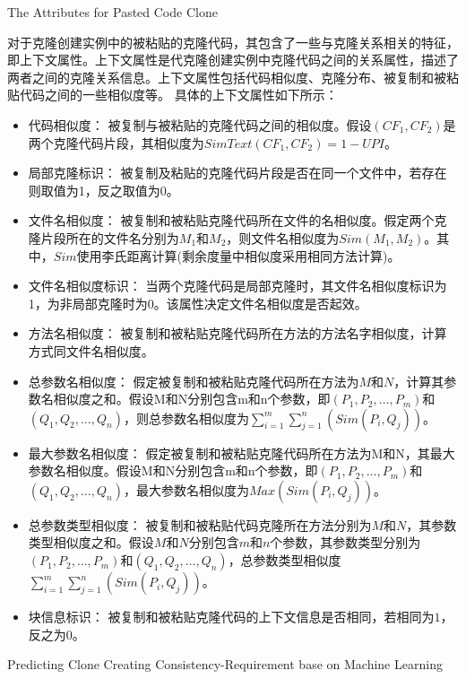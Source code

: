 {The Attributes for Pasted Code Clone}

对于克隆创建实例中的被粘贴的克隆代码，其包含了一些与克隆关系相关的特征，即上下文属性。上下文属性是代克隆创建实例中克隆代码之间的关系属性，描述了两者之间的克隆关系信息。上下文属性包括代码相似度、克隆分布、被复制和被粘贴代码之间的一些相似度等。
具体的上下文属性如下所示：

\begin{itemize}
\item
代码相似度：
被复制与被粘贴的克隆代码之间的相似度。假设$(CF_1,CF_2) $是两个克隆代码片段，其相似度为$\mathit{SimText} (CF_1,CF_2) = 1-\mathit{UPI}$。
\item
局部克隆标识：
被复制及粘贴的克隆代码片段是否在同一个文件中，若存在则取值为1，反之取值为0。
\item
文件名相似度：
被复制和被粘贴克隆代码所在文件的名相似度。假定两个克隆片段所在的文件名分别为$M_1$和$M_2$，则文件名相似度为$\mathit{Sim}(M_1,M_2)$。其中，$\mathit{Sim}$使用李氏距离\cite{levenshtein1966binary,navarro2001guided}计算(剩余度量中相似度采用相同方法计算)。
\item
文件名相似度标识：
当两个克隆代码是局部克隆时，其文件名相似度标识为1，为非局部克隆时为0。该属性决定文件名相似度是否起效。
\item
方法名相似度：
被复制和被粘贴克隆代码所在方法的方法名字相似度，计算方式同文件名相似度。
\item
总参数名相似度：
假定被复制和被粘贴克隆代码所在方法为$M$和$N$，计算其参数名相似度之和。假设M和N分别包含m和n个参数，即$(P_1,P_2,…,P_m)$和$(Q_1,Q_2,…,Q_n)$，则总参数名相似度为$\mathit{\sum_{i=1}^m \sum_{j=1}^n (Sim(P_i,Q_j))}$。
\item
最大参数名相似度：
假定被复制和被粘贴克隆代码所在方法为M和N，其最大参数名相似度。假设M和N分别包含m和n个参数，即$(P_1,P_2,…,P_m)$和$(Q_1,Q_2,…,Q_n)$，最大参数名相似度为$\mathit{Max (Sim(P_i,Q_j))}$。
\item 
总参数类型相似度：
被复制和被粘贴代码克隆所在方法分别为$M$和$N$，其参数类型相似度之和。假设$M$和$N$分别包含$m$和$n$个参数，其参数类型分别为$(P_1,P_2,…,P_m)$和$(Q_1,Q_2,…,Q_n)$，总参数类型相似度$\mathit{\sum_{i=1}^m \sum_{j=1}^n (Sim(P_i,Q_j))}$。
\item
块信息标识：
被复制和被粘贴克隆代码的上下文信息是否相同，若相同为$1$，反之为$0$。
\end{itemize}

{Predicting Clone Creating Consistency-Requirement base on Machine Learning}
\label{lab-machine}

